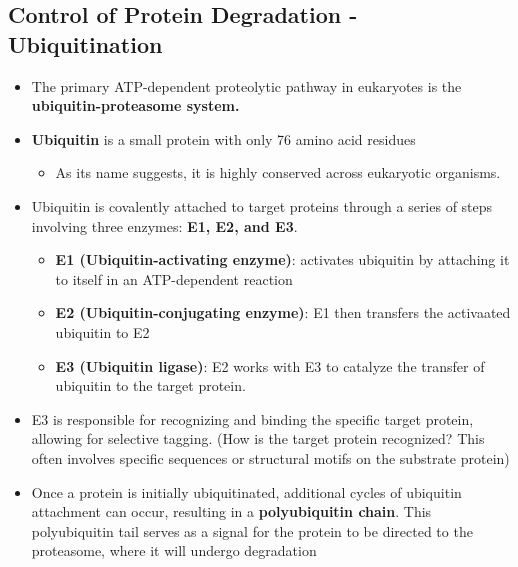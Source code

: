\documentclass[10pt]{article}
\begin{document}
\subsection*{Control of Protein Degradation - Ubiquitination}
\begin{itemize}
    \item The primary ATP-dependent proteolytic pathway in eukaryotes is the \textbf{ubiquitin-proteasome system.}
    \item \textbf{Ubiquitin} is a small protein with only 76 amino acid residues
    \begin{itemize}
        \item As its name suggests, it is highly conserved across eukaryotic organisms.
    \end{itemize}
    \item Ubiquitin is covalently attached to target proteins through a series of steps involving three enzymes: \textbf{E1, E2, and E3}.
    \begin{itemize}
        \item \textbf{E1 (Ubiquitin-activating enzyme)}: activates ubiquitin by attaching it to itself in an ATP-dependent reaction
        \item \textbf{E2 (Ubiquitin-conjugating enzyme)}: E1 then transfers the activaated ubiquitin to E2
        \item \textbf{E3 (Ubiquitin ligase)}: E2 works with E3 to catalyze the transfer of ubiquitin to the target protein.
    \end{itemize}
    \item E3 is responsible for recognizing and binding the specific target protein, allowing for selective tagging.  (How is the target protein recognized?  This often involves specific sequences or structural motifs on the substrate protein)
    \item Once a protein is initially ubiquitinated, additional cycles of ubiquitin attachment can occur, resulting in a \textbf{polyubiquitin chain}.  This polyubiquitin tail serves as a signal for the protein to be directed to the proteasome, where it will undergo degradation
\end{itemize}
\end{document}
